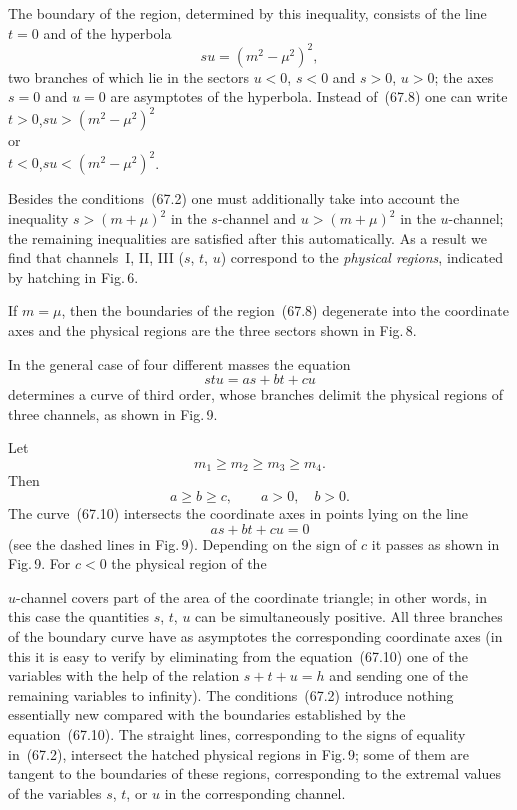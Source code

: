 The boundary of the region, determined by this inequality, consists of the line $t = 0$ and of the hyperbola
\begin{equation}
su = (m^2 - \mu^2)^2,
\tag{67.9}
\end{equation}
two branches of which lie in the sectors $u < 0$, $s < 0$ and $s > 0$, $u > 0$; the axes $s = 0$ and $u = 0$ are asymptotes of the hyperbola. Instead of~(67.8) one can write\\
$t > 0$,\quad $su > (m^2 - \mu^2)^2$\\
or\\
$t < 0$,\quad $su < (m^2 - \mu^2)^2$.

Besides the conditions~(67.2) one must additionally take into account the inequality $s > (m + \mu)^2$ in the $s$-channel and $u > (m + \mu)^2$ in the $u$-channel; the remaining inequalities are satisfied after this automatically. As a result we find that channels~I, II, III ($s$, $t$, $u$) correspond to the \textit{physical regions}, indicated by hatching in Fig.\,6.

If $m = \mu$, then the boundaries of the region~(67.8) degenerate into the coordinate axes and the physical regions are the three sectors shown in Fig.\,8.

In the general case of four different masses the equation
\begin{equation}
stu = as + bt + cu
\tag{67.10}
\end{equation}
determines a curve of third order, whose branches delimit the physical regions of three channels, as shown in Fig.\,9.

Let
\[
m_1 \geqslant m_2 \geqslant m_3 \geqslant m_4.
\]
Then
\[
a \geqslant b \geqslant c,\qquad a > 0,\quad b > 0.
\]
The curve~(67.10) intersects the coordinate axes in points lying on the line
\[
as + bt + cu = 0
\]
(see the dashed lines in Fig.\,9). Depending on the sign of $c$ it passes as shown in Fig.\,9. For $c < 0$ the physical region of the

$u$-channel covers part of the area of the coordinate triangle; in other words, in this case the quantities $s$, $t$, $u$ can be simultaneously positive. All three branches of the boundary curve have as asymptotes the corresponding coordinate axes (in this it is easy to verify by eliminating from the equation~(67.10) one of the variables with the help of the relation $s + t + u = h$ and sending one of the remaining variables to infinity). The conditions~(67.2) introduce nothing essentially new compared with the boundaries established by the equation~(67.10). The straight lines, corresponding to the signs of equality in~(67.2), intersect the hatched physical regions in Fig.\,9; some of them are tangent to the boundaries of these regions, corresponding to the extremal values of the variables $s$, $t$, or $u$ in the corresponding channel.

